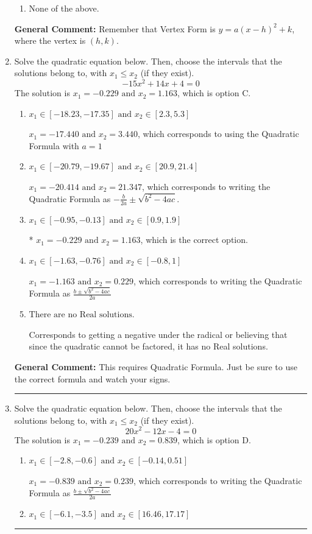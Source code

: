 \documentclass{extbook}[14pt]
\newcommand{\litem}[1]{\item #1

\rule{\textwidth}{0.4pt}}
\begin{document}
\begin{enumerate}
{\begin{enumerate}[label=\Alph*.]
\begin{multicols}{2}
\end{multicols}\item None of the above.\end{enumerate}
\textbf{General Comment:} Remember that Vertex Form is $y = a(x-h)^2+k$, where the vertex is $(h, k)$.
}
\litem{
Solve the quadratic equation below. Then, choose the intervals that the solutions belong to, with $x_1 \leq x_2$ (if they exist).
\[ -15x^{2} +14 x + 4 = 0 \]The solution is \( x_1 = -0.229 \text{ and } x_2 = 1.163 \), which is option C.\begin{enumerate}[label=\Alph*.]
\item \( x_1 \in [-18.23, -17.35] \text{ and } x_2 \in [2.3, 5.3] \)

 $x_1 = -17.440 \text{ and } x_2 = 3.440$, which corresponds to using the Quadratic Formula with $a=1$
\item \( x_1 \in [-20.79, -19.67] \text{ and } x_2 \in [20.9, 21.4] \)

 $x_1 = -20.414 \text{ and } x_2 = 21.347$, which corresponds to writing the Quadratic Formula as $-\frac{b}{2a} \pm \sqrt{b^2 - 4ac}$.
\item \( x_1 \in [-0.95, -0.13] \text{ and } x_2 \in [0.9, 1.9] \)

* $x_1 = -0.229 \text{ and } x_2 = 1.163$, which is the correct option.
\item \( x_1 \in [-1.63, -0.76] \text{ and } x_2 \in [-0.8, 1] \)

 $x_1 = -1.163 \text{ and } x_2 = 0.229$, which corresponds to writing the Quadratic Formula as $\frac{b \pm \sqrt{b^2 - 4ac}}{2a}$
\item \( \text{There are no Real solutions.} \)

Corresponds to getting a negative under the radical or believing that since the quadratic cannot be factored, it has no Real solutions.
\end{enumerate}

\textbf{General Comment:} This requires Quadratic Formula. Just be sure to use the correct formula and watch your signs.
}
\litem{
Solve the quadratic equation below. Then, choose the intervals that the solutions belong to, with $x_1 \leq x_2$ (if they exist).
\[ 20x^{2} -12 x -4 = 0 \]The solution is \( x_1 = -0.239 \text{ and } x_2 = 0.839 \), which is option D.\begin{enumerate}[label=\Alph*.]
\item \( x_1 \in [-2.8, -0.6] \text{ and } x_2 \in [-0.14, 0.51] \)

 $x_1 = -0.839 \text{ and } x_2 = 0.239$, which corresponds to writing the Quadratic Formula as $\frac{b \pm \sqrt{b^2 - 4ac}}{2a}$
\item \( x_1 \in [-6.1, -3.5] \text{ and } x_2 \in [16.46, 17.17] \)


\end{enumerate}}
\end{enumerate}
\end{document}
